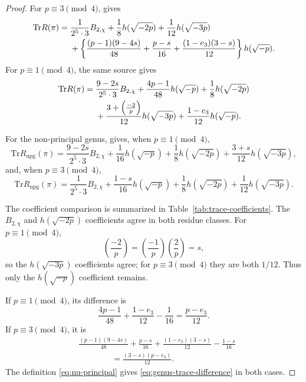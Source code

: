 \documentclass[10pt,a4paper]{amsart}
\newcommand{\Tr}{\mathrm{Tr}}
\providecommand{\kro}[2]{\left(\frac{#1}{#2}\right)}
\begin{document}
	\begin{proof}
		For $p\equiv3\pmod4$, \cite[Rem.~3]{IbukiyamaKatsura} gives
		\begin{align}
			\Tr R(\pi)
			={}&\frac{1}{2^5\cdot3}B_{2,\chi}
			+\frac18h(\sqrt{-2p})
			+\frac1{12}h(\sqrt{-3p}) \notag\\
			&+\left\{
			\frac{(p-1)(9-4s)}{48}
			+\frac{p-s}{16}
			+\frac{(1-e_3)(3-s)}{12}
			\right\}h(\sqrt{-p}).
			\label{eq:principal-trace-3mod4}
		\end{align}
		For $p\equiv1\pmod4$, the same source gives
		\begin{align}
			\Tr R(\pi)
			={}&\frac{9-2s}{2^5\cdot3}B_{2,\chi}
			+\frac{4p-1}{48}h(\sqrt{-p})
			+\frac18h(\sqrt{-2p}) \notag\\
			&+\frac{3+\kro{-2}{p}}{12}h(\sqrt{-3p})
			+\frac{1-e_3}{12}h(\sqrt{-p}).
			\label{eq:principal-trace-1mod4}
		\end{align}
		
		For the non-principal genus, \cite[Thm.~5.2]{Ibukiyama2019quinary} gives,
		when $p\equiv1\pmod4$,
		\begin{equation}
			\Tr R_{\mathrm{npg}}(\pi)
			=\frac{9-2s}{2^5\cdot3}B_{2,\chi}
			+\frac1{16}h(\sqrt{-p})
			+\frac18h(\sqrt{-2p})
			+\frac{3+s}{12}h(\sqrt{-3p}),
			\label{eq:TOH1}
		\end{equation}
		and, when $p\equiv3\pmod4$,
		\begin{equation}
			\Tr R_{\mathrm{npg}}(\pi)
			=\frac{1}{2^5\cdot3}B_{2,\chi}
			+\frac{1-s}{16}h(\sqrt{-p})
			+\frac18h(\sqrt{-2p})
			+\frac1{12}h(\sqrt{-3p}).
			\label{eq:TOH3}
		\end{equation}
		
		The coefficient comparison is summarized in
		Table~\ref{tab:trace-coefficients}. The $B_{2,\chi}$ and
		$h(\sqrt{-2p})$ coefficients agree in both residue classes. For
		$p\equiv1\pmod4$,
		\[
		\kro{-2}{p}=\kro{-1}{p}\kro{2}{p}=s,
		\]
		so the $h(\sqrt{-3p})$ coefficients agree; for $p\equiv3\pmod4$ they
		are both $1/12$. Thus only the $h(\sqrt{-p})$ coefficient remains.
		
		If $p\equiv1\pmod4$, its difference is
		\[
		\frac{4p-1}{48}+\frac{1-e_3}{12}-\frac1{16}
		=\frac{p-e_3}{12}.
		\]
		If $p\equiv3\pmod4$, it is
		\begin{align*}
			&\frac{(p-1)(9-4s)}{48}
			+\frac{p-s}{16}
			+\frac{(1-e_3)(3-s)}{12}
			-\frac{1-s}{16}\\
			&\hspace{4em}=
			\frac{(3-s)(p-e_3)}{12}.
		\end{align*}
		The definition \eqref{eq:nu-principal} gives
		\eqref{eq:genus-trace-difference} in both cases.
	\end{proof}
	
\end{document}
